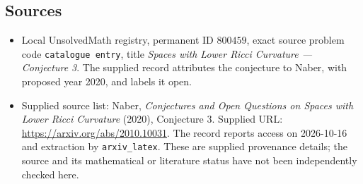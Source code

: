 \documentclass[11pt]{article}
\begin{document}
\subsection{Sources}
\begin{itemize}
\item Local UnsolvedMath registry, permanent ID \(800459\), exact source problem code \texttt{catalogue entry}, title \emph{Spaces with Lower Ricci Curvature --- Conjecture 3}. The supplied record attributes the conjecture to Naber, with proposed year 2020, and labels it open.
\item Supplied source list: Naber, \emph{Conjectures and Open Questions on Spaces with Lower Ricci Curvature} (2020), Conjecture 3. Supplied URL: \url{https://arxiv.org/abs/2010.10031}. The record reports access on 2026-10-16 and extraction by \texttt{arxiv\_latex}. These are supplied provenance details; the source and its mathematical or literature status have not been independently checked here.
\end{itemize}
\end{document}
